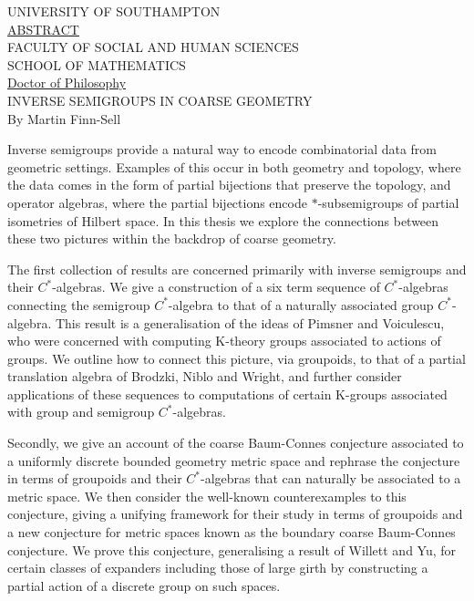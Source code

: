 \begin{center}
UNIVERSITY OF SOUTHAMPTON\\[0.75cm]

\underline{ABSTRACT}\\[0.55cm]

FACULTY OF SOCIAL AND HUMAN SCIENCES\\
SCHOOL OF MATHEMATICS\\[0.75cm]

\underline{Doctor of Philosophy}\\[0.55cm]

INVERSE SEMIGROUPS IN COARSE GEOMETRY\\[0.6cm]

By Martin Finn-Sell\\[1.5cm]
\end{center}


Inverse semigroups provide a natural way to encode combinatorial data from geometric settings. Examples of this occur in both geometry and topology, where the data comes in the form of partial bijections that preserve the topology, and operator algebras, where the partial bijections encode $*$-subsemigroups of partial isometries of Hilbert space. In this thesis we explore the connections between these two pictures within the backdrop of coarse geometry.

The first collection of results are concerned primarily with inverse semigroups and their $C^{*}$-algebras. We give a construction of a six term sequence of $C^{*}$-algebras connecting the semigroup $C^{*}$-algebra to that of a naturally associated group $C^{*}$-algebra. This result is a generalisation of the ideas of Pimsner and Voiculescu, who were concerned with computing K-theory groups associated to actions of groups. We outline how to connect this picture, via groupoids, to that of a partial translation algebra of Brodzki, Niblo and Wright, and further consider applications of these sequences to computations of certain K-groups associated with group and semigroup $C^{*}$-algebras.

Secondly, we give an account of the coarse Baum-Connes conjecture associated to a uniformly discrete bounded geometry metric space and rephrase the conjecture in terms of groupoids and their $C^{*}$-algebras that can naturally be associated to a metric space. We then consider the well-known counterexamples to this conjecture, giving a unifying framework for their study in terms of groupoids and a new conjecture for metric spaces known as the boundary coarse Baum-Connes conjecture. We prove this conjecture, generalising a result of Willett and Yu, for certain classes of expanders including those of large girth by constructing a partial action of a discrete group on such spaces.